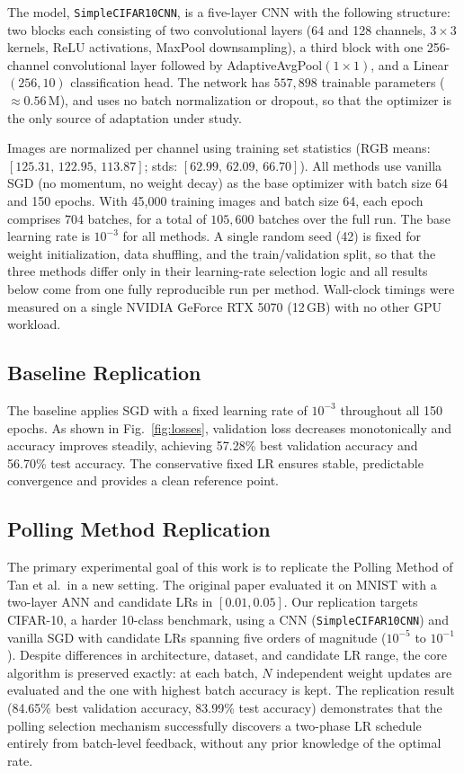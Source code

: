 \documentclass[conference]{IEEEtran}
\begin{document}
The model, \texttt{SimpleCIFAR10CNN}, is a five-layer CNN with the following structure: two blocks each consisting of two convolutional layers (64 and 128 channels, $3\!\times\!3$ kernels, ReLU activations, MaxPool downsampling), a third block with one 256-channel convolutional layer followed by AdaptiveAvgPool$(1\!\times\!1)$, and a Linear$(256, 10)$ classification head. The network has $557{,}898$ trainable parameters ($\approx 0.56$\,M), and uses no batch normalization or dropout, so that the optimizer is the only source of adaptation under study.

Images are normalized per channel using training set statistics (RGB means: $[125.31,\, 122.95,\, 113.87]$; stds: $[62.99,\, 62.09,\, 66.70]$). All methods use vanilla SGD (no momentum, no weight decay) as the base optimizer with batch size 64 and 150 epochs. With 45{,}000 training images and batch size 64, each epoch comprises $704$ batches, for a total of $105{,}600$ batches over the full run. The base learning rate is $10^{-3}$ for all methods. A single random seed (42) is fixed for weight initialization, data shuffling, and the train/validation split, so that the three methods differ only in their learning-rate selection logic and all results below come from one fully reproducible run per method. Wall-clock timings were measured on a single NVIDIA GeForce RTX 5070 (12\,GB) with no other GPU workload.

\subsection{Baseline Replication}

The baseline applies SGD with a fixed learning rate of $10^{-3}$ throughout all 150 epochs. As shown in Fig.~\ref{fig:losses}, validation loss decreases monotonically and accuracy improves steadily, achieving 57.28\% best validation accuracy and 56.70\% test accuracy. The conservative fixed LR ensures stable, predictable convergence and provides a clean reference point.

\subsection{Polling Method Replication}

The primary experimental goal of this work is to replicate the Polling Method of Tan et al.\ in a new setting. The original paper evaluated it on MNIST with a two-layer ANN and candidate LRs in $[0.01, 0.05]$. Our replication targets CIFAR-10, a harder 10-class benchmark, using a CNN (\texttt{SimpleCIFAR10CNN}) and vanilla SGD with candidate LRs spanning five orders of magnitude ($10^{-5}$ to $10^{-1}$). Despite differences in architecture, dataset, and candidate LR range, the core algorithm is preserved exactly: at each batch, $N$ independent weight updates are evaluated and the one with highest batch accuracy is kept. The replication result (84.65\% best validation accuracy, 83.99\% test accuracy) demonstrates that the polling selection mechanism successfully discovers a two-phase LR schedule entirely from batch-level feedback, without any prior knowledge of the optimal rate.
\end{document}
